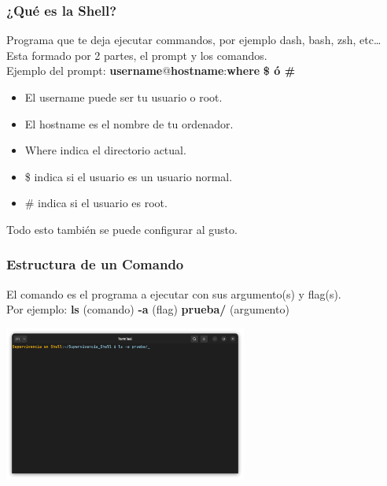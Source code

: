 \documentclass[10pt]{beamer}
\begin{document}
	\begin{frame}
		\frametitle{¿Qué es la Shell?}
		Programa que te deja ejecutar commandos, por ejemplo dash, bash, zsh, etc…	\\
		Esta formado por 2 partes, el prompt y los comandos.\\
		\newline
		Ejemplo del prompt:
		\textbf{username}@\textbf{hostname}:\textbf{where} \textbf{\$ ó \#}\\
		\begin{itemize}
			\item El username puede ser tu usuario o root.\\
			\item El hostname es el nombre de tu ordenador.\\
			\item Where indica el directorio actual.\\
			\item \$ indica si el usuario es un usuario normal.\\
			\item \# indica si el usuario es root.
		\end{itemize}
		Todo esto también se puede configurar al gusto.	
	\end{frame}

	\begin{frame}
		\frametitle{Estructura de un Comando}
		El comando es el programa a ejecutar con sus argumento(s) y flag(s).\\
		Por ejemplo: \textbf{ls} (comando) \textbf{-a} (flag) \textbf{prueba/} (argumento)		
		\begin{center}
			\includegraphics[width=0.60\textwidth]{cmd}
		\end{center}
	\end{frame}
	
\end{document}
